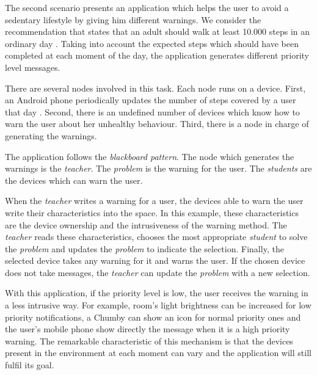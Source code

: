 The second scenario presents an application which helps the user to avoid a sedentary lifestyle by giving him different warnings.
We consider the recommendation that states that an adult should walk at least 10.000 steps in an ordinary day \citep{tudor2002taking}.
Taking into account the expected steps which should have been completed at each moment of the day, the application generates different priority level messages.

There are several nodes involved in this task.
Each node runs on a device. %
First, an Android phone periodically updates the number of steps covered by a user that day .
Second, there is an undefined number of devices which know how to warn the user about her unhealthy behaviour.
Third, there is a node in charge of generating the warnings.


\medskip


The application follows the \emph{blackboard pattern}.
The node which generates the warnings is the \emph{teacher}.
The \emph{problem} is the warning for the user.
The \emph{students} are the devices which can warn the user. %


When the \emph{teacher} writes a warning for a user, the devices able to warn the user write their characteristics into the space. %
In this example, these characteristics are the device ownership and the intrusiveness of the warning method.
The \emph{teacher} reads these characteristics, chooses the most appropriate \emph{student} to solve the \emph{problem} and updates the \emph{problem} to indicate the selection.
Finally, the selected device takes any warning for it and warns the user. %
If the chosen device does not take messages, the \emph{teacher} can update the \emph{problem} with a new selection.


With this application, if the priority level is low, the user receives the warning in a less intrusive way.
For example, room's light brightness can be increased for low priority notifications, a Chumby  can show an icon for normal priority ones and the user's mobile phone show directly the message when it is a high priority warning. %
The remarkable characteristic of this mechanism is that the devices present in the environment at each moment can vary and the application will still fulfil its goal.




